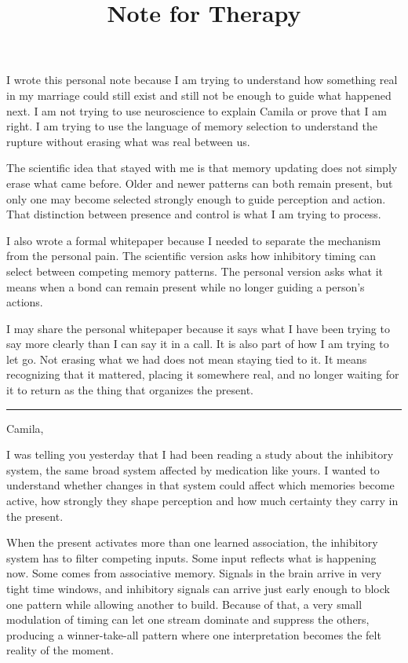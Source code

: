 \documentclass[10pt,twocolumn]{article}
\title{Note for Therapy}
\author{}
\date{}
\begin{document}
\maketitle

I wrote this personal note because I am trying to understand how something real in my marriage could still exist and still not be enough to guide what happened next. I am not trying to use neuroscience to explain Camila or prove that I am right. I am trying to use the language of memory selection to understand the rupture without erasing what was real between us.

The scientific idea that stayed with me is that memory updating does not simply erase what came before. Older and newer patterns can both remain present, but only one may become selected strongly enough to guide perception and action. That distinction between presence and control is what I am trying to process.

I also wrote a formal whitepaper because I needed to separate the mechanism from the personal pain. The scientific version asks how inhibitory timing can select between competing memory patterns. The personal version asks what it means when a bond can remain present while no longer guiding a person's actions.

I may share the personal whitepaper because it says what I have been trying to say more clearly than I can say it in a call. It is also part of how I am trying to let go. Not erasing what we had does not mean staying tied to it. It means recognizing that it mattered, placing it somewhere real, and no longer waiting for it to return as the thing that organizes the present.

\vspace{0.2em}
\hrule
\vspace{0.35em}

Camila,

I was telling you yesterday that I had been reading a study about the inhibitory system, the same broad system affected by medication like yours. I wanted to understand whether changes in that system could affect which memories become active, how strongly they shape perception and how much certainty they carry in the present.

When the present activates more than one learned association, the inhibitory system has to filter competing inputs. Some input reflects what is happening now. Some comes from associative memory. Signals in the brain arrive in very tight time windows, and inhibitory signals can arrive just early enough to block one pattern while allowing another to build. Because of that, a very small modulation of timing can let one stream dominate and suppress the others, producing a winner-take-all pattern where one interpretation becomes the felt reality of the moment.
\end{document}
